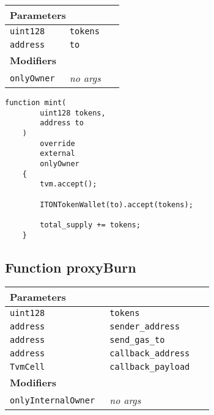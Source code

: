 \ifsoltables
\noindent\begin{tabular}{|l|l|p{5cm}|}\hline
\multicolumn{3}{|l|}{\bf Parameters}\\\hline
\tt uint128 & \tt tokens &\\\hline
\tt address & \tt to &\\\hline
\multicolumn{3}{|l|}{\bf Modifiers}\\\hline
\tt onlyOwner & {\em no args} &\\\hline
\end{tabular}
\fi

\vspace{2cm}

\begin{lstlisting}[firstnumber=282]
    function mint(
        uint128 tokens,
        address to
    )
        override
        external
        onlyOwner
    {
        tvm.accept();

        ITONTokenWallet(to).accept(tokens);

        total_supply += tokens;
    }
\end{lstlisting}

\subsection{Function proxyBurn}


\ifsoltables
\noindent\begin{tabular}{|l|l|p{5cm}|}\hline
\multicolumn{3}{|l|}{\bf Parameters}\\\hline
\tt uint128 & \tt tokens &\\\hline
\tt address & \tt sender\_{}address &\\\hline
\tt address & \tt send\_{}gas\_{}to &\\\hline
\tt address & \tt callback\_{}address &\\\hline
\tt TvmCell & \tt callback\_{}payload &\\\hline
\multicolumn{3}{|l|}{\bf Modifiers}\\\hline
\tt onlyInternalOwner & {\em no args} &\\\hline
\end{tabular}
\fi

\vspace{2cm}

